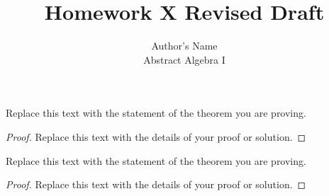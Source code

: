 \documentclass{article}
\newenvironment{theorem}[2][Theorem]{\begin{trivlist}
\item[\hskip \labelsep {\bfseries #1}\hskip \labelsep {\bfseries #2.}]}{\end{trivlist}}
\begin{document}

\title{Homework X Revised Draft} %
\author{Author's Name\\Abstract Algebra I} %

\maketitle

%
%

\begin{theorem}{x.yz}
Replace this text with the statement of the theorem you are proving.
\end{theorem}

\begin{proof}
Replace this text with the details of your proof or solution.
\end{proof}


\vspace{0.25in} %

\begin{theorem}{x.yz}
Replace this text with the statement of the theorem you are proving.
\end{theorem}

\begin{proof}
Replace this text with the details of your proof or solution.
\end{proof}

\end{document}
